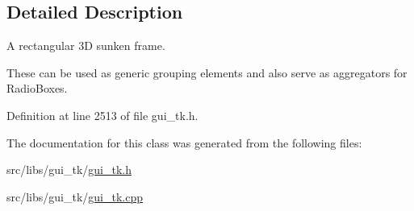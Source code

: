 \subsection{Detailed Description}
A rectangular 3\-D sunken frame. 

These can be used as generic grouping elements and also serve as aggregators for Radio\-Boxes. 

Definition at line 2513 of file gui\-\_\-tk.\-h.



The documentation for this class was generated from the following files\-:\begin{DoxyCompactItemize}
\item 
src/libs/gui\-\_\-tk/\hyperlink{gui__tk_8h}{gui\-\_\-tk.\-h}\item 
src/libs/gui\-\_\-tk/\hyperlink{gui__tk_8cpp}{gui\-\_\-tk.\-cpp}\end{DoxyCompactItemize}
